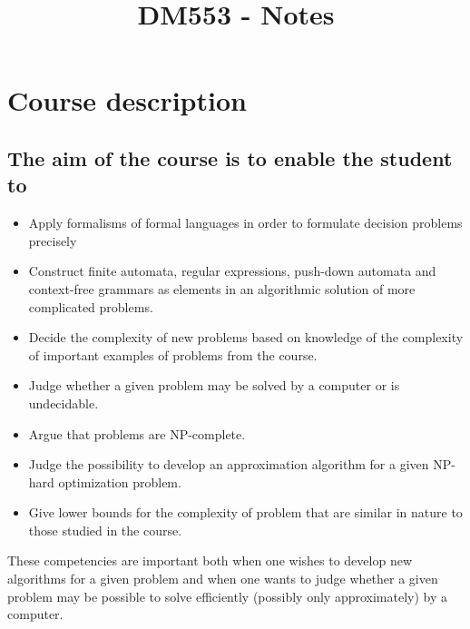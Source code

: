 \documentclass[a4paper,10pt,titlepage]{report}
\title{DM553 - Notes}
\date{}
\begin{document}
\renewcommand{\thepage}{\roman{page}}%
\tableofcontents
\newpage
\setcounter{page}{1}
\renewcommand{\thepage}{\arabic{page}}
\section{Course description}
\subsection{The aim of the course is to enable the student to }
\begin{itemize}


\item Apply formalisms of formal languages in order to formulate decision problems precisely
\item Construct finite automata, regular expressions, push-down automata and context-free grammars as elements in an algorithmic solution of more complicated problems.\\

\item Decide the complexity of new problems based on knowledge of the complexity of important examples of problems from the course.
\item Judge whether a given problem may be solved by a computer or is undecidable.
\item Argue that problems are NP-complete. 
\item Judge the possibility to develop an approximation algorithm for a given NP-hard optimization problem.
\item Give lower bounds for the complexity of problem that are similar in nature to those studied in the course.
\end{itemize}

These competencies are important both when one wishes to develop new 
algorithms for a given problem and when one wants to judge whether a 
given problem may be possible to solve efficiently (possibly only 
approximately) by a computer.\\
\vspace{5mm}
\end{document}
